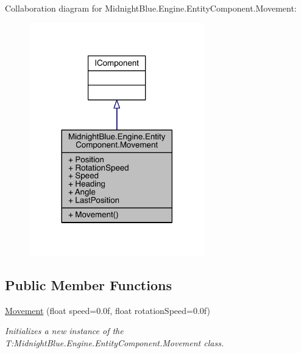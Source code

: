 Collaboration diagram for Midnight\+Blue.\+Engine.\+Entity\+Component.\+Movement\+:
\nopagebreak
\begin{figure}[H]
\begin{center}
\leavevmode
\includegraphics[width=216pt]{class_midnight_blue_1_1_engine_1_1_entity_component_1_1_movement__coll__graph}
\end{center}
\end{figure}
\subsection*{Public Member Functions}
\begin{DoxyCompactItemize}
\item 
\hyperlink{class_midnight_blue_1_1_engine_1_1_entity_component_1_1_movement_a36a4bcca5a6f471b5ddd8b5dad063dfd}{Movement} (float speed=0.\+0f, float rotation\+Speed=0.\+0f)
\begin{DoxyCompactList}\small\item\em Initializes a new instance of the T\+:\+Midnight\+Blue.\+Engine.\+Entity\+Component.\+Movement class. \end{DoxyCompactList}\end{DoxyCompactItemize}
